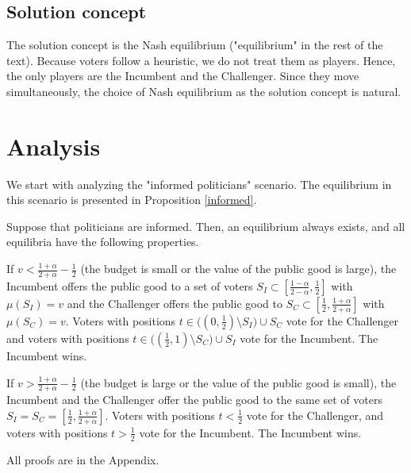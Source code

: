 \documentclass[12pt,english]{article}
\begin{document}
\subsection{Solution concept}

The solution concept is the Nash equilibrium ("equilibrium" in the rest of the text). Because voters follow a heuristic, we do not treat them as players. Hence, the only players are the Incumbent and the Challenger. Since they move simultaneously, the choice of Nash equilibrium as the solution concept is natural.  

\section{Analysis} \label{sect-analysis}

We start with analyzing the "informed politicians" scenario. The equilibrium in this scenario is presented in Proposition \ref{informed}.

\begin{proposition}
\label{informed}
Suppose that politicians are informed. Then, an equilibrium always exists, and all equilibria have the following properties. 

If $v <  \frac{1 + \alpha}{2 + \alpha} - \frac{1}{2}$ (the budget is small or the value of the public good is large), the Incumbent offers the public good to a set of voters $S_I \subset [\frac{1 - \alpha}{2 - \alpha},\frac{1}{2}]$ with $\mu(S_I) = v$ and the Challenger offers the public good to $S_C \subset [\frac{1}{2}, \frac{1 + \alpha}{2 + \alpha}]$ with $\mu(S_C) = v$. Voters with positions $t \in \big((0,\frac{1}{2}) \setminus S_I \big) \cup S_C$ vote for the Challenger and voters with positions  $t \in \big((\frac{1}{2},1) \setminus S_C \big) \cup S_I$ vote for the Incumbent.  The Incumbent wins. 

If $v > \frac{1 + \alpha}{2 + \alpha} - \frac{1}{2}$ (the budget is large or the value of the public good is small), the Incumbent and the Challenger offer the public good to the same set of voters $S_I = S_C = [\frac{1}{2}, \frac{1 + \alpha}{2 + \alpha}]$. Voters with positions $t < \frac{1}{2}$ vote for the Challenger, and voters with positions $t > \frac{1}{2}$ vote for the Incumbent. The Incumbent wins. 

\end{proposition}
All proofs are in the Appendix.
\end{document}
